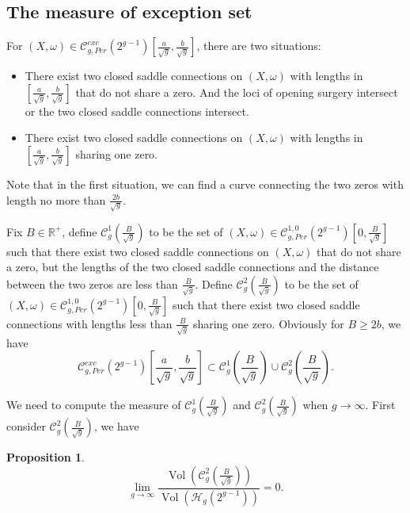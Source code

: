 \documentclass[12pt]{amsart} %
\newtheorem{proposition}[theorem]{Proposition}
\theoremstyle{definition}
\theoremstyle{remark}
\numberwithin{equation}{section}
\renewcommand\H{{\mathcal H}}
\newcommand{\V}{\operatorname{Vol}}
\begin{document}
\subsection{The measure of exception set}\label{exception}

For $(X,\omega)\in \mathcal{C}^{exc}_{g,Per}(2^{g-1})[\frac{a}{\sqrt{g}},\frac{b}{\sqrt{g}}]$, there are two situations: 
\begin{itemize}
  \item[1]  There exist two closed saddle connections on $(X,\omega)$ with lengths in $[\frac{a}{\sqrt{g}},\frac{b}{\sqrt{g}}]$
            that do not share a zero. And the loci of opening surgery intersect or the two closed saddle connections intersect.
  \item[2]  There exist two closed saddle connections on $(X,\omega)$ with lengths in $[\frac{a}{\sqrt{g}},\frac{b}{\sqrt{g}}]$ sharing one zero.
\end{itemize}

Note that in the first situation, we can find a curve connecting the two zeros with length no more than $\frac{2b}{\sqrt{g}}$.


Fix $B\in \mathbb{R}^+$, define $\mathcal{C}_g^{1}(\frac{B}{\sqrt{g}})$ to be the set of $(X,\omega)\in \mathcal{C}^{1,0}_{g,Per}(2^{g-1})[0,\frac{B}{\sqrt{g}}]$ 
such that there exist two closed saddle connections on $(X,\omega)$
that do not share a zero, but the lengths of the two closed saddle connections and the distance between the two zeros are less than $\frac{B}{\sqrt{g}}$.
Define $\mathcal{C}_g^{2}(\frac{B}{\sqrt{g}})$ to be the set of $(X,\omega)\in \mathcal{C}^{1,0}_{g,Per}(2^{g-1})[0,\frac{B}{\sqrt{g}}]$ 
such that there exist two closed saddle connections with lengths less than $\frac{B}{\sqrt{g}}$ sharing one zero.
Obviously for $B\geq 2b$, we have 
$$ \mathcal{C}^{exc}_{g,Per}(2^{g-1})[\frac{a}{\sqrt{g}},\frac{b}{\sqrt{g}}]\subset \mathcal{C}_g^{1}(\frac{B}{\sqrt{g}}) \cup \mathcal{C}_g^{2}(\frac{B}{\sqrt{g}}).$$


We need to compute the measure of $\mathcal{C}_g^{1}(\frac{B}{\sqrt{g}})$ and $\mathcal{C}_g^{2}(\frac{B}{\sqrt{g}})$ when $g\to \infty$.
First consider $\mathcal{C}_g^{2}(\frac{B}{\sqrt{g}})$, we have
\begin{proposition}\label{chain}
$$\lim_{g\to \infty}\frac{\V(\mathcal{C}_g^{2}(\frac{B}{\sqrt{g}}))}{\V(\H_g(2^{g-1}))} = 0.$$
\end{proposition}
\end{document}
